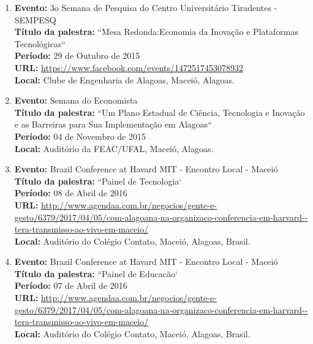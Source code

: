 \documentclass[a4paper,oneside,10pt]{article}
\begin{document}
\begin{enumerate}
\renewcommand{\labelenumi}{{\large\bfseries\arabic{enumi}.}}

\item   \textbf{Evento:} 3o Semana de Pesquisa do Centro Universitário Tiradentes - SEMPESQ
  \mbox{} \\
         \textbf{Título da palestra:}  ``Mesa Redonda:Economia da Inovação e Plataformas Tecnológicas``\\
        \textbf{Período:} 29 de Outubro de 2015\\
        \textbf{URL:} \url{https://www.facebook.com/events/1472517453078932}\\
        \textbf{Local:} Clube de Engenharia de Alagoas, Maceió, Alagoas. 

\item   \textbf{Evento:} Semana do Economista
  \mbox{} \\
         \textbf{Título da palestra:}  ``Um Plano Estadual de Ciência, Tecnologia e Inovação e as Barreiras para Sua Implementação em Alagoas``\\
        \textbf{Período:} 04 de Novembro de 2015\\
        \textbf{Local:} Auditório da FEAC/UFAL, Maceió, Alagoas.     
        
 \item   \textbf{Evento:} Brazil Conference at Havard MIT - Encontro Local - Maceió
  \mbox{} \\
         \textbf{Título da palestra:}  ``Painel de Tecnologia`\\
        \textbf{Período:} 08 de Abril de 2016\\
        \textbf{URL:} \url{http://www.agendaa.com.br/negocios/gente-e-gesto/6379/2017/04/05/com-alagoana-na-organizaco-conferencia-em-harvard--tera-transmisso-ao-vivo-em-maceio/}\\
        \textbf{Local:} Auditório do Colégio Contato, Maceió, Alagoas, Brasil.
        
\item   \textbf{Evento:} Brazil Conference at Havard MIT - Encontro Local - Maceió
  \mbox{} \\
         \textbf{Título da palestra:}  ``Painel de Educacão`\\
        \textbf{Período:} 07 de Abril de 2016\\
        \textbf{URL:} \url{http://www.agendaa.com.br/negocios/gente-e-gesto/6379/2017/04/05/com-alagoana-na-organizaco-conferencia-em-harvard--tera-transmisso-ao-vivo-em-maceio/}\\
        \textbf{Local:} Auditório do Colégio Contato, Maceió, Alagoas, Brasil.


\end{enumerate}
\end{document}
